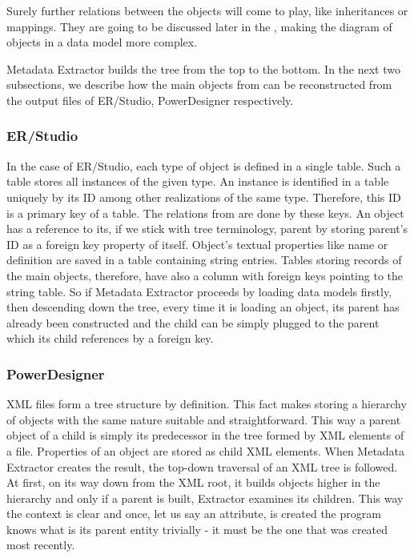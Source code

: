 Surely further relations between the objects will come to play, like inheritances or mappings. They are going to be discussed later in the , making the diagram of objects in a data model more complex.

Metadata Extractor builds the tree from the top to the bottom. 
In the next two subsections, we describe how the main objects from  can be reconstructed from the output files of ER/Studio, PowerDesigner respectively.

\subsubsection{ER/Studio}

In the case of ER/Studio, each type of object is defined in a single table. Such a table stores all instances of the given type. 
An instance is identified in a table uniquely by its ID among other realizations of the same type.
Therefore, this ID is a primary key of a table. The relations from  are 
done by these keys.
An object has a reference to its, if we stick with tree terminology, parent by storing parent's ID as a foreign key property of itself. 
Object's textual properties like name or definition are saved in a table containing string entries. 
Tables storing records of the main objects, therefore, have also a column with foreign keys pointing to the string table. 
So if Metadata Extractor proceeds by loading data models firstly, then descending down the tree, every time it is loading an object, its parent has already been constructed and the child can be simply plugged to the parent which its child references by a foreign key.

\subsubsection{PowerDesigner}

XML files form a tree structure by definition. This fact makes storing a hierarchy of objects with the same nature suitable and straightforward. 
This way a parent object of a child is simply its predecessor in the tree formed by XML elements of a file. 
Properties of an object are stored as child XML elements.
When Metadata Extractor creates the result, the top-down traversal of an XML tree is followed. 
At first, on its way down from the XML root, it builds objects higher in the hierarchy and only if a parent is built, Extractor examines its children. 
This way the context is clear and once, let us say an attribute, is created the program knows what is its parent entity trivially - it must be the one that was created most recently.

